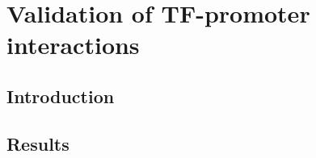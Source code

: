\documentclass[../main.tex]{subfiles}
\begin{document}
\chapter{Validation of TF-promoter interactions}\label{chapter4}
\section{Introduction}\label{chapter4:introduction}

\section{Results}\label{chapter4:results}
\end{document}
